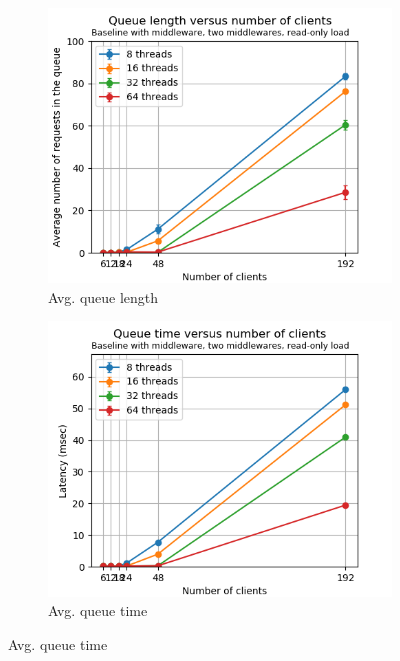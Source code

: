 \documentclass[11pt,a4paper]{article}
\begin{document}
\begin{figure}[h]
\centering
\begin{subfigure}{.33\textwidth}
  \centering
  \includegraphics[width=1.0\linewidth,trim={0px 0px 0px 0px},clip]{img/plot/mwb2-ro-qlen-mini.png}
  \caption{Avg. queue length}
  \label{fig:mwb2-ro-qlen-mini}
\end{subfigure}%
\begin{subfigure}{.33\textwidth}
  \centering
  \includegraphics[width=1.0\linewidth,trim={0px 0px 0px 0px},clip]{img/plot/mwb2-ro-qtime-mini.png}
  \caption{Avg. queue time}
  \label{fig:mwb2-ro-qtime-mini}

\end{subfigure}
\end{figure}
\end{document}
